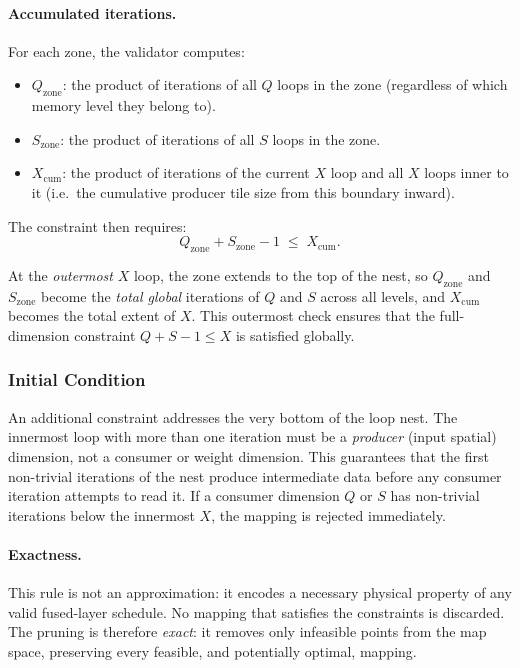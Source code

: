 \paragraph{Accumulated iterations.}
For each zone, the validator computes:
\begin{itemize}
  \item $Q_{\text{zone}}$: the product of iterations of all $Q$ loops
        in the zone (regardless of which memory level they belong to).
  \item $S_{\text{zone}}$: the product of iterations of all $S$ loops
        in the zone.
  \item $X_{\text{cum}}$: the product of iterations of the current $X$
        loop and all $X$ loops inner to it (i.e.\ the cumulative
        producer tile size from this boundary inward).
\end{itemize}
The constraint then requires:
\begin{equation}
\label{eq:ps-pruning-check-width}
  Q_{\text{zone}} + S_{\text{zone}} - 1 \;\le\; X_{\text{cum}}.
\end{equation}

\noindent
At the \emph{outermost} $X$ loop, the zone extends to the top of the
nest, so $Q_{\text{zone}}$ and $S_{\text{zone}}$ become the
\emph{total global} iterations of $Q$ and $S$ across all levels, and
$X_{\text{cum}}$ becomes the total extent of $X$.
This outermost check ensures that the full-dimension constraint
$Q + S - 1 \le X$ is satisfied globally.


\subsubsection{Initial Condition}

An additional constraint addresses the very bottom of the loop nest.
The innermost loop with more than one iteration must be a
\emph{producer} (input spatial) dimension, not a consumer or weight
dimension.
This guarantees that the first non-trivial iterations of the nest
produce intermediate data before any consumer iteration attempts to
read it.
If a consumer dimension $Q$ or $S$ has non-trivial iterations below
the innermost $X$, the mapping is rejected immediately.


\paragraph{Exactness.}
This rule is not an approximation: it encodes a necessary physical
property of any valid fused-layer schedule.
No mapping that satisfies the constraints is discarded.
The pruning is therefore \emph{exact}: it removes only infeasible
points from the map space, preserving every feasible, and potentially
optimal, mapping.


